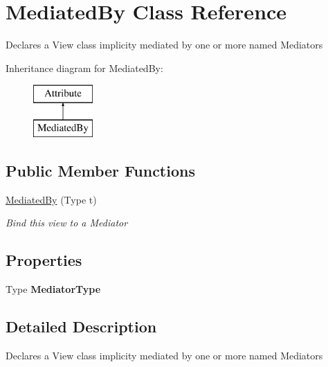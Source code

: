 \hypertarget{class_mediated_by}{\section{Mediated\-By Class Reference}
\label{class_mediated_by}
}


Declares a View class implicity mediated by one or more named Mediators  


Inheritance diagram for Mediated\-By\-:\begin{figure}[H]
\begin{center}
\leavevmode
\includegraphics[height=2.000000cm]{class_mediated_by}
\end{center}
\end{figure}
\subsection*{Public Member Functions}
\begin{DoxyCompactItemize}
\item 
\hyperlink{class_mediated_by_a484a5b39698f3046443270cb362256aa}{Mediated\-By} (Type t)
\begin{DoxyCompactList}\small\item\em Bind this view to a Mediator \end{DoxyCompactList}\end{DoxyCompactItemize}
\subsection*{Properties}
\begin{DoxyCompactItemize}
\item 
\hypertarget{class_mediated_by_a20f74e932533c119b9d52a7513680562}{Type {\bfseries Mediator\-Type}}\label{class_mediated_by_a20f74e932533c119b9d52a7513680562}

\end{DoxyCompactItemize}


\subsection{Detailed Description}
Declares a View class implicity mediated by one or more named Mediators 




